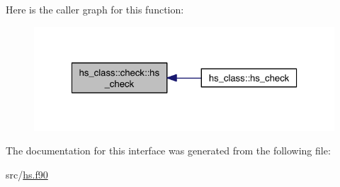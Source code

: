 Here is the caller graph for this function\-:
\nopagebreak
\begin{figure}[H]
\begin{center}
\leavevmode
\includegraphics[width=324pt]{interfacehs__class_1_1check_a5109e86865a66c671c91e253adea4ac1_icgraph}
\end{center}
\end{figure}




The documentation for this interface was generated from the following file\-:\begin{DoxyCompactItemize}
\item 
src/\hyperlink{hs_8f90}{hs.\-f90}\end{DoxyCompactItemize}
